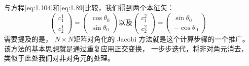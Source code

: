 与方程\eqref{eq:1.104}和\eqref{eq:1.89}比较，我们得到两个本征矢：
\begin{subequations}
 \begin{equation}
     \begin{pmatrix}
      c_1^1 \\ c_2^1 
     \end{pmatrix} = \begin{pmatrix}
      \cos\theta_0 \\ \sin\theta_0
     \end{pmatrix}
     \label{eq:1.107a}
 \end{equation}
 以及
 \begin{equation}
     \begin{pmatrix}
      c_1^2 \\ c_2^2 
     \end{pmatrix} = \begin{pmatrix}
      \sin\theta_0 \\ -\cos\theta_0
     \end{pmatrix}
     \label{eq:1.107b}
 \end{equation}
 \label{eq:1.107}
\end{subequations}
需要提及的是，
$N\times N$矩阵对角化的 Jacobi 方法就是这个计算步骤的一个推广。
该方法的基本思想就是通过重复应用正交变换，
一步步迭代，将非对角元消去，
类似于此处我们对非对角元的处理。





